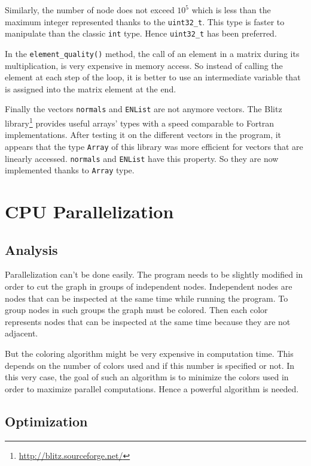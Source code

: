 \documentclass[fleqn,11pt]{SelfArx} %
\begin{document}
Similarly, the number of node does not exceed $10^5$ which is less than the maximum integer represented thanks to the \verb+uint32_t+. This type is faster to manipulate than the classic \verb+int+ type. Hence \verb+uint32_t+ has been preferred.

In the \verb+element_quality()+ method, the call of an element in a matrix during its multiplication, is very expensive in memory access. So instead of calling the element at each step of the loop, it is better to use an intermediate variable that is assigned into the matrix element at the end.

Finally the vectors \verb+normals+ and \verb+ENList+ are not anymore vectors. The {Blitz library}\footnote{\url{http://blitz.sourceforge.net/}} provides useful arrays' types with a speed comparable to Fortran implementations. After testing it on the different vectors in the program, it appears that the type \verb+Array+ of this library was more efficient for vectors that are linearly accessed. \verb+normals+ and \verb+ENList+ have this property. So they are now implemented thanks to \verb+Array+ type.


\section{CPU Parallelization}

\subsection{Analysis}

Parallelization can't be done easily. The program needs to be slightly modified in order to cut the graph in groups of independent nodes. Independent nodes are nodes that can be inspected at the same time while running the program. To group nodes in such groups the graph must be colored. Then each color represents nodes that can be inspected at the same time because they are not adjacent.

But the coloring algorithm might be very expensive in computation time. This depends on the number of colors used and if this number is specified or not. In this very case, the goal of such an algorithm is to minimize the colors used in order to maximize parallel computations. Hence a powerful algorithm is needed.

\subsection{Optimization}
\end{document}
